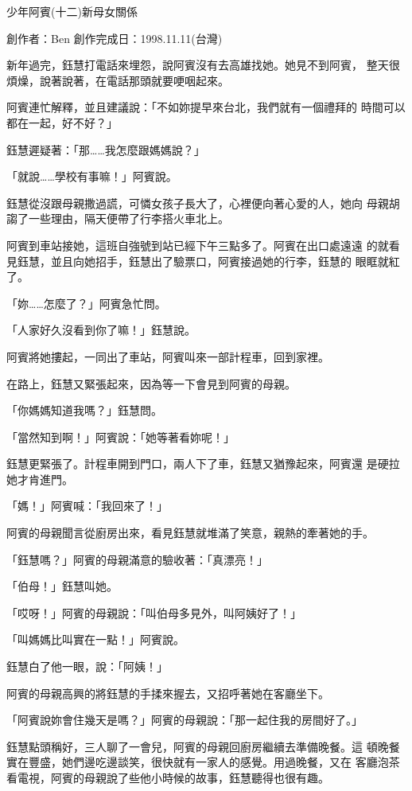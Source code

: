 



少年阿賓(十二)新母女關係

創作者：Ben
創作完成日：1998.11.11(台灣)


新年過完，鈺慧打電話來埋怨，說阿賓沒有去高雄找她。她見不到阿賓，
整天很煩燥，說著說著，在電話那頭就要哽咽起來。

阿賓連忙解釋，並且建議說：「不如妳提早來台北，我們就有一個禮拜的
時間可以都在一起，好不好？」

鈺慧遲疑著：「那……我怎麼跟媽媽說？」

「就說……學校有事嘛！」阿賓說。

鈺慧從沒跟母親撒過謊，可憐女孩子長大了，心裡便向著心愛的人，她向
母親胡謅了一些理由，隔天便帶了行李搭火車北上。

阿賓到車站接她，這班自強號到站已經下午三點多了。阿賓在出口處遠遠
的就看見鈺慧，並且向她招手，鈺慧出了驗票口，阿賓接過她的行李，鈺慧的
眼眶就紅了。

「妳……怎麼了？」阿賓急忙問。

「人家好久沒看到你了嘛！」鈺慧說。

阿賓將她摟起，一同出了車站，阿賓叫來一部計程車，回到家裡。

在路上，鈺慧又緊張起來，因為等一下會見到阿賓的母親。

「你媽媽知道我嗎？」鈺慧問。

「當然知到啊！」阿賓說：「她等著看妳呢！」

鈺慧更緊張了。計程車開到門口，兩人下了車，鈺慧又猶豫起來，阿賓還
是硬拉她才肯進門。

「媽！」阿賓喊：「我回來了！」

阿賓的母親聞言從廚房出來，看見鈺慧就堆滿了笑意，親熱的牽著她的手。

「鈺慧嗎？」阿賓的母親滿意的驗收著：「真漂亮！」

「伯母！」鈺慧叫她。

「哎呀！」阿賓的母親說：「叫伯母多見外，叫阿姨好了！」

「叫媽媽比叫實在一點！」阿賓說。

鈺慧白了他一眼，說：「阿姨！」

阿賓的母親高興的將鈺慧的手揉來握去，又招呼著她在客廳坐下。

「阿賓說妳會住幾天是嗎？」阿賓的母親說：「那一起住我的房間好了。」

鈺慧點頭稱好，三人聊了一會兒，阿賓的母親回廚房繼續去準備晚餐。這
頓晚餐實在豐盛，她們邊吃邊談笑，很快就有一家人的感覺。用過晚餐，又在
客廳泡茶看電視，阿賓的母親說了些他小時候的故事，鈺慧聽得也很有趣。

